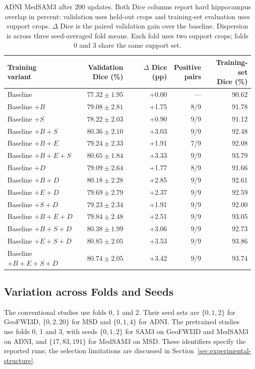 \documentclass[12pt,a4paper]{article}
\begin{document}
\begin{table}[htbp]
\centering\small{}
\setlength{\tabcolsep}{5pt}
\renewcommand{\arraystretch}{1.15}
\begin{tabular}{@{}lrrrr@{}}
\hline
\shortstack{Training\\variant} & \shortstack{Validation\\Dice (\%)} & \shortstack{$\Delta$ Dice\\(pp)} & \shortstack{Positive\\pairs} & \shortstack{Training-set\\Dice (\%)} \\
\hline
Baseline & $77.32\pm1.95$ & +0.00 & --- & 90.62 \\
Baseline $+B$ & $79.08\pm2.81$ & +1.75 & 8/9 & 91.78 \\
Baseline $+S$ & $78.22\pm2.03$ & +0.90 & 9/9 & 91.12 \\
Baseline $+B+S$ & $80.36\pm2.10$ & +3.03 & 9/9 & 92.48 \\
Baseline $+B+E$ & $79.24\pm2.33$ & +1.91 & 7/9 & 92.08 \\
Baseline $+B+E+S$ & $80.65\pm1.84$ & +3.33 & 9/9 & 93.79 \\
Baseline $+D$ & $79.09\pm2.64$ & +1.77 & 8/9 & 91.66 \\
Baseline $+B+D$ & $80.18\pm2.28$ & +2.85 & 9/9 & 92.61 \\
Baseline $+E+D$ & $79.69\pm2.79$ & +2.37 & 9/9 & 92.59 \\
Baseline $+S+D$ & $79.23\pm2.34$ & +1.91 & 9/9 & 92.00 \\
Baseline $+B+E+D$ & $79.84\pm2.48$ & +2.51 & 9/9 & 93.05 \\
Baseline $+B+S+D$ & $80.38\pm1.99$ & +3.06 & 9/9 & 92.73 \\
Baseline $+E+S+D$ & $80.85\pm2.05$ & +3.53 & 9/9 & 93.86 \\
Baseline $+B+E+S+D$ & $80.74\pm2.05$ & +3.42 & 9/9 & 93.74 \\
\hline
\end{tabular}
\caption{ADNI MedSAM3 after 200 updates. Both Dice columns report hard
hippocampus overlap in percent: validation uses held-out crops and
training-set evaluation uses support crops. $\Delta$ Dice is the paired
validation gain over the baseline. Dispersion is across three
seed-averaged fold means. Each fold uses two support crops; folds 0 and 3
share the same support set.}
\label{tab:medsam-adni-noaug}
\end{table}

\subsection{Variation across Folds and Seeds}
\label{sec:replication-identifiers}
The conventional studies use folds 0, 1 and 2. Their seed sets are
$\{0,1,2\}$ for GeoFWI3D, $\{0,2,20\}$ for MSD and $\{0,1,4\}$ for
ADNI. The pretrained studies use folds 0, 1 and 3, with seeds
$\{0,1,2\}$ for SAM3 on GeoFWI3D and MedSAM3 on ADNI, and
$\{17,83,191\}$ for MedSAM3 on MSD. These identifiers specify the
reported runs; the selection limitations are discussed in
Section~\ref{sec:experimental-structure}.
\end{document}
